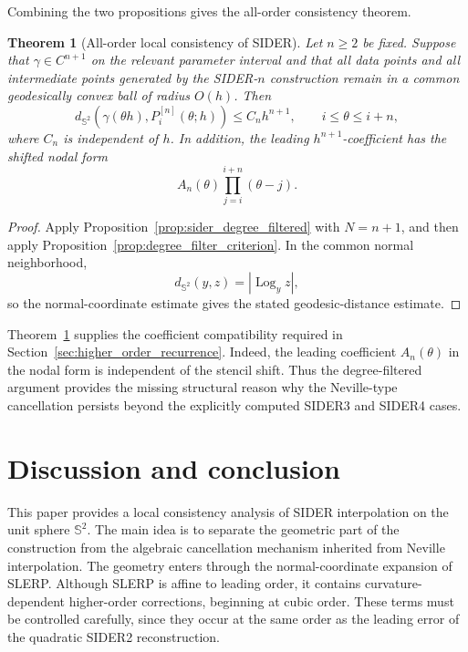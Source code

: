 \documentclass[a4paper,11pt]{article}
\newcommand{\bS}{\mathbb{S}}
\newcommand{\Log}{\operatorname{Log}}
\newtheorem{thm}{Theorem}
\numberwithin{equation}{section}
\begin{document}
Combining the two propositions gives the all-order consistency theorem.

\begin{thm}[All-order local consistency of SIDER]
\label{thm:all_order_sider}
Let \(n\ge2\) be fixed.  Suppose that
\(\gamma\in C^{n+1}\) on the relevant parameter interval and that all data
points and all intermediate points generated by the SIDER-\(n\) construction
remain in a common geodesically convex ball of radius \(O(h)\).  Then
\[
        d_{\bS^2}\!\left(
        \gamma(\theta h),P_i^{[n]}(\theta;h)
        \right)
        \le C_n h^{n+1},
        \qquad i\le\theta\le i+n,
\]
where \(C_n\) is independent of \(h\).  In addition, the leading
\(h^{n+1}\)-coefficient has the shifted nodal form
\[
        A_n(\theta)\prod_{j=i}^{i+n}(\theta-j).
\]
\end{thm}

\begin{proof}
Apply Proposition~\ref{prop:sider_degree_filtered} with \(N=n+1\), and then
apply Proposition~\ref{prop:degree_filter_criterion}.  In the common normal
neighborhood,
\[
        d_{\bS^2}(y,z)=|\Log_y z|,
\]
so the normal-coordinate estimate gives the stated geodesic-distance estimate.
\end{proof}

Theorem~\ref{thm:all_order_sider} supplies the coefficient compatibility
required in Section~\ref{sec:higher_order_recurrence}.  Indeed, the leading
coefficient \(A_n(\theta)\) in the nodal form is independent of the stencil
shift.  Thus the degree-filtered argument provides the missing structural
reason why the Neville-type cancellation persists beyond the explicitly
computed SIDER3 and SIDER4 cases.


\section{Discussion and conclusion}

This paper provides a local consistency analysis of SIDER interpolation on the
unit sphere \(\bS^2\).  The main idea is to separate the geometric part of the
construction from the algebraic cancellation mechanism inherited from
Neville interpolation.  The geometry enters through the normal-coordinate
expansion of SLERP.  Although SLERP is affine to leading order, it contains
curvature-dependent higher-order corrections, beginning at cubic order.  These
terms must be controlled carefully, since they occur at the same order as the
leading error of the quadratic SIDER2 reconstruction.
\end{document}
